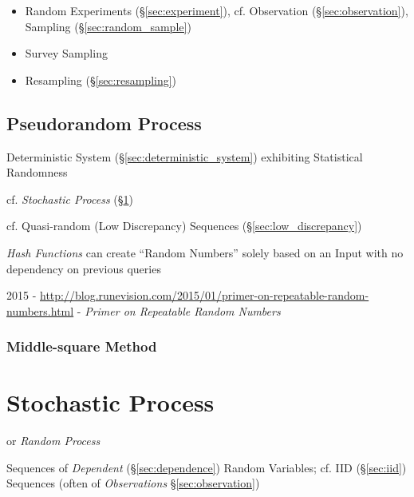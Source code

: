 \begin{itemize}
  \item Random Experiments (\S\ref{sec:experiment}), cf. Observation
    (\S\ref{sec:observation}), Sampling (\S\ref{sec:random_sample})
  \item Survey Sampling
  \item Resampling (\S\ref{sec:resampling})
\end{itemize}



\subsection{Pseudorandom Process}\label{sec:pseudorandom_process}

Deterministic System (\S\ref{sec:deterministic_system}) exhibiting Statistical
Randomness

cf. \emph{Stochastic Process} (\S\ref{sec:stochastic_process})

cf. Quasi-random (Low Discrepancy) Sequences (\S\ref{sec:low_discrepancy})

\emph{Hash Functions} can create ``Random Numbers'' solely based on an Input
with no dependency on previous queries

2015 -
\url{http://blog.runevision.com/2015/01/primer-on-repeatable-random-numbers.html}
- \emph{Primer on Repeatable Random Numbers}



\subsubsection{Middle-square Method}\label{sec:middle_square_method}



\section{Stochastic Process}\label{sec:stochastic_process}

or \emph{Random Process}

Sequences of \emph{Dependent} (\S\ref{sec:dependence}) Random Variables; cf. IID
(\S\ref{sec:iid}) Sequences (often of \emph{Observations}
\S\ref{sec:observation})

